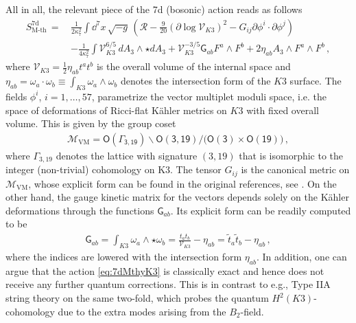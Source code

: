 All in all, the relevant piece of the 7d (bosonic) action reads as follows
%
\begin{equation}\label{eq:7dMthyK3}
	\begin{aligned}
		S_\text{M-th}^{\text{7d}}\, =\, & \frac{1}{2\kappa^2_7} \int \dd^{7}x\, \sqrt{-g}\,  \left( \mathcal{R} - \frac{9}{20} \left( \partial \log \mathcal{V}_{K3} \right)^2 - G_{i j} \partial \phi^i \cdot \partial \phi^j\right)\\
        &  -\frac{1}{4\kappa_{7}^2} \int \mathcal{V}_{K3}^{6/5}\, dA_3 \wedge \star dA_3 + \mathcal{V}_{K3}^{-3/5} \mathsf{G}_{a b} F^a \wedge F^b + 2\eta_{a b} A_3 \wedge F^a \wedge F^b\, ,
	\end{aligned}
\end{equation}
%
where $\mathcal{V}_{K3} = \frac{1}{2} \eta_{ab} t^a t^b$ is the overall volume of the internal space and $\eta_{ab}= \omega_a \cdot \omega_b \equiv \int_{K3} \omega_a \wedge \omega_b$ denotes the intersection form of the $K3$ surface. The fields $\phi^i$, $i=1, \ldots, 57$, parametrize the vector multiplet moduli space, i.e. the space of deformations of Ricci-flat K\"ahler metrics on $K3$ with fixed overall volume. This is given by the group coset \cite{Aspinwall:1996mn}
%
\begin{align}\label{eq:cosetspace7d}
	\mathcal{M}_{\text{VM}} = \mathsf{O(\Gamma_{3,19})}\backslash \mathsf{O(3,19)} / (\mathsf{O(3)} \times \mathsf{O(19))}\, ,
\end{align}
%
where $\Gamma_{3,19}$ denotes the lattice with signature $(3,19)$ that is isomorphic to the integer (non-trivial) cohomology on K3. The tensor $G_{ij}$ is the canonical metric on $\mathcal{M}_{\text{VM}}$, whose explicit form can be found in the original references, see \cite{Duff:1983vj}. On the other hand, the gauge kinetic matrix for the vectors depends solely on the K\"ahler deformations through the functions $\mathsf{G}_{a b}$. Its explicit form can be readily computed to be \cite{Lee:2019xtm}
%
\begin{equation}\label{eq:7dmodspacemetric}
	\begin{aligned}
		\mathsf{G}_{a b} = \int_{K3} \omega_a \wedge \star \omega_b = \frac{t_a t_b}{\mathcal{V}_{K3}}- \eta_{a b} = \tilde{t}_a \tilde{t}_b -\eta_{a b}\, ,
	\end{aligned}
\end{equation}
%
where the indices are lowered with the intersection form $\eta_{a b}$. In addition, one can argue that the action \eqref{eq:7dMthyK3} is classically exact \cite{Witten:1995ex, Cadavid:1995bk} and hence does not receive any further quantum corrections. This is in contrast to e.g., Type IIA string theory on the same two-fold, which probes the quantum $H^2(K3)$-cohomology due to the extra modes arising from the $B_2$-field.


